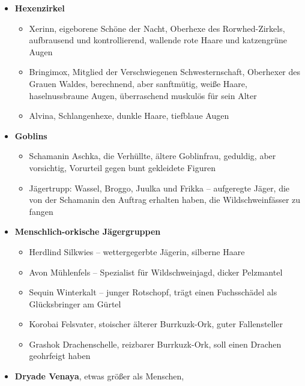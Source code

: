      \begin{itemize}
   	\item \textbf{Hexenzirkel}
                \begin{itemize}
        	\item  Xerinn, eigeborene Schöne der Nacht, Oberhexe des Rorwhed-Zirkels, aufbrausend und kontrollierend, wallende rote Haare und katzengrüne Augen
       \item Bringimox, Mitglied der Verschwiegenen Schwesternschaft, Oberhexer des Grauen Waldes, berechnend, aber sanftmütig, weiße Haare, haselnussbraune Augen, überraschend muskulös für sein Alter
        \item Alvina, Schlangenhexe, dunkle Haare, tiefblaue Augen
        \end{itemize}
    \item \textbf{Goblins}
                \begin{itemize}
        	\item  Schamanin Aschka, die Verhüllte, ältere Goblinfrau, geduldig, aber vorsichtig, Vorurteil gegen bunt gekleidete Figuren
        \item Jägertrupp: Wassel, Broggo, Juulka und Frikka -- aufgeregte Jäger, die von der Schamanin den Auftrag erhalten haben, die Wildschweinfässer zu fangen
        \end{itemize}
    \item \textbf{Menschlich-orkische Jägergruppen}
            \begin{itemize}
    	\item Herdlind Silkwies -- wettergegerbte Jägerin, silberne Haare
        \item Avon Mühlenfels -- Spezialist für Wildschweinjagd, dicker Pelzmantel
        \item Sequin Winterkalt -- junger Rotschopf, trägt einen Fuchsschädel als Glücksbringer am Gürtel
        \item Korobai Felsvater, stoischer älterer Burrkuzk-Ork, guter Fallensteller
        \item Grashok Drachenschelle, reizbarer Burrkuzk-Ork, soll einen Drachen geohrfeigt haben
        \end{itemize}
    \item \textbf{Dryade Venaya}, etwas größer als Menschen, 
    \end{itemize}


\spaltenende
